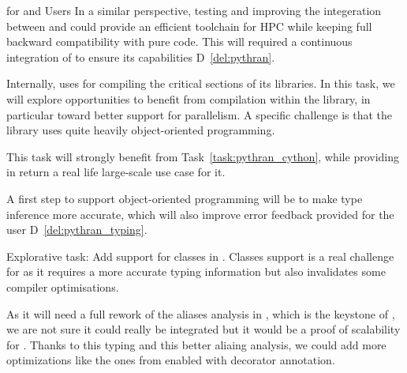 \begin{Workpackage}{\thewpno}
\begin{task}{\Pythran for \Sage and \Sage Users}
  In a similar perspective, testing and improving the integeration between
   and \Pythran could provide an efficient toolchain for HPC
  while keeping full backward compatibility with pure \Python code. This will
  required a continuous integration of \Pythran to ensure its capabilities
  D~\ref{del:pythran}.

  Internally, \Sage uses \Cython for compiling the critical sections of
  its libraries. In this task, we will explore opportunities to
  benefit from \Pythran compilation within the \Sage library, in
  particular toward better support for parallelism. A specific
  challenge is that the \Sage library uses quite heavily
  object-oriented programming.

  This task will strongly benefit from Task~\ref{task:pythran_cython},
  while providing in return a real life large-scale use case for it.

  A first step to support object-oriented programming will be to make
  \Pythran type inference more accurate, which will also improve error
  feedback provided for the user D~\ref{del:pythran_typing}.
\end{task}

\begin{task}{Explorative task: Add support for classes in \Pythran.}
  Classes support is a real challenge for \Pythran as it requires a more
  accurate typing information but also invalidates some compiler optimisations.

  As it will need a full rework of the aliases analysis in \Pythran, which is
  the keystone of \Pythran, we are not sure it could really
  be integrated but it would be a proof of scalability for \Pythran.
  Thanks to this typing and this better aliaing analysis, we could add more
  optimizations like the ones from \Cython enabled with decorator annotation.
\end{task}

\begin{WPDeliverables}
\end{WPDeliverables}
\end{Workpackage}

